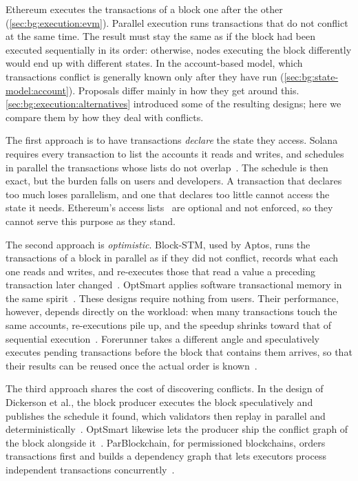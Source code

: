 Ethereum executes the transactions of a block one after the other (\autoref{sec:bg:execution:evm}).
Parallel execution runs transactions that do not conflict at the same time.
The result must stay the same as if the block had been executed sequentially in its order: otherwise, nodes executing the block differently would end up with different states.
In the account-based model, which transactions conflict is generally known only after they have run (\autoref{sec:bg:state-model:account}).
Proposals differ mainly in how they get around this. \autoref{sec:bg:execution:alternatives} introduced some of the resulting designs; here we compare them by how they deal with conflicts.

The first approach is to have transactions \emph{declare} the state they access.
Solana requires every transaction to list the accounts it reads and writes, and schedules in parallel the transactions whose lists do not overlap~\cite{yakovenko2019sealevel}.
The schedule is then exact, but the burden falls on users and developers.
A transaction that declares too much loses parallelism, and one that declares too little cannot access the state it needs.
Ethereum's access lists~\cite{eip2930} are optional and not enforced, so they cannot serve this purpose as they stand.

The second approach is \emph{optimistic}.
Block-STM, used by Aptos, runs the transactions of a block in parallel as if they did not conflict, records what each one reads and writes, and re-executes those that read a value a preceding transaction later changed~\cite{gelashvili2023blockstm}.
OptSmart applies software transactional memory in the same spirit~\cite{anjana2022optsmart}. 
These designs require nothing from users.
Their performance, however, depends directly on the workload: when many transactions touch the same accounts, re-executions pile up, and the speedup shrinks toward that of sequential execution~\cite{gelashvili2023blockstm}. 
Forerunner takes a different angle and speculatively executes pending transactions before the block that contains them arrives, so that their results can be reused once the actual order is known~\cite{chen2021forerunner}. 

The third approach shares the cost of discovering conflicts.
In the design of Dickerson et al., the block producer executes the block speculatively and publishes the schedule it found, which validators then replay in parallel and deterministically~\cite{dickerson2017concurrency}.
OptSmart likewise lets the producer ship the conflict graph of the block alongside it~\cite{anjana2022optsmart}.
ParBlockchain, for permissioned blockchains, orders transactions first and builds a dependency graph that lets executors process independent transactions concurrently~\cite{amiri2019parblockchain}. 

